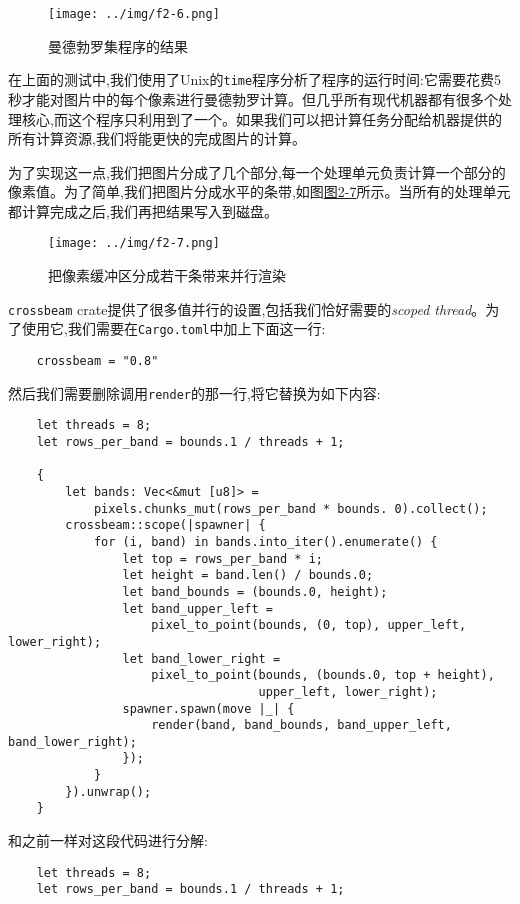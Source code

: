 \begin{figure}[htbp]
    \centering
    \texttt{[image: ../img/f2-6.png]}
    \caption{曼德勃罗集程序的结果}
    \label{f2-6}
\end{figure}

在上面的测试中,我们使用了Unix的\texttt{time}程序分析了程序的运行时间:它需要花费5秒才能对图片中的每个像素进行曼德勃罗计算。但几乎所有现代机器都有很多个处理核心,而这个程序只利用到了一个。如果我们可以把计算任务分配给机器提供的所有计算资源,我们将能更快的完成图片的计算。

为了实现这一点,我们把图片分成了几个部分,每一个处理单元负责计算一个部分的像素值。为了简单,我们把图片分成水平的条带,如图\hyperref[f2-7]{图2-7}所示。当所有的处理单元都计算完成之后,我们再把结果写入到磁盘。
\begin{figure}[htbp]
    \centering
    \texttt{[image: ../img/f2-7.png]}
    \caption{把像素缓冲区分成若干条带来并行渲染}
    \label{f2-7}
\end{figure}

\texttt{crossbeam} crate提供了很多值并行的设置,包括我们恰好需要的\emph{scoped thread}。为了使用它,我们需要在\texttt{Cargo.toml}中加上下面这一行:
\begin{verbatim}
    crossbeam = "0.8"
\end{verbatim}

然后我们需要删除调用\texttt{render}的那一行,将它替换为如下内容:
\begin{verbatim}
    let threads = 8;
    let rows_per_band = bounds.1 / threads + 1;

    {
        let bands: Vec<&mut [u8]> =
            pixels.chunks_mut(rows_per_band * bounds. 0).collect();
        crossbeam::scope(|spawner| {
            for (i, band) in bands.into_iter().enumerate() {
                let top = rows_per_band * i;
                let height = band.len() / bounds.0;
                let band_bounds = (bounds.0, height);
                let band_upper_left =
                    pixel_to_point(bounds, (0, top), upper_left, lower_right);
                let band_lower_right =
                    pixel_to_point(bounds, (bounds.0, top + height),
                                   upper_left, lower_right);
                spawner.spawn(move |_| {
                    render(band, band_bounds, band_upper_left, band_lower_right);
                });
            }
        }).unwrap();
    }
\end{verbatim}

和之前一样对这段代码进行分解:
\begin{verbatim}
    let threads = 8;
    let rows_per_band = bounds.1 / threads + 1;
\end{verbatim}

